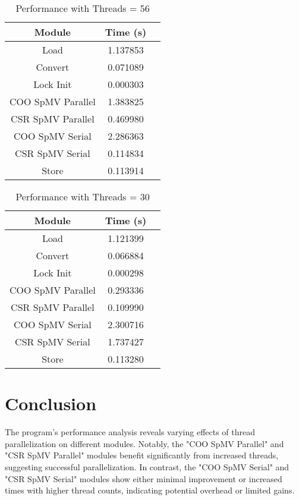 \documentclass[11pt, twocolumn]{article}
\begin{document}
\begin{table}[H]
    \centering
    \begin{tabular}{|c|c|c|}
    \hline
    Module & Time (s)  \\
    \hline
    Load & 1.137853  \\
    Convert & 0.071089  \\
    Lock Init & 0.000303  \\
    COO SpMV Parallel & 1.383825  \\
    CSR SpMV Parallel & 0.469980  \\
    COO SpMV Serial & 2.286363  \\
    CSR SpMV Serial & 0.114834  \\
    Store & 0.113914 \\
    
    \hline
    \end{tabular}
    \caption{Performance with Threads = 56}
\end{table}

\begin{table}[H]
    \centering
    \begin{tabular}{|c|c|c|}
    \hline
    Module & Time (s)  \\
    \hline
    Load & 1.121399  \\
    Convert & 0.066884 \\
    Lock Init & 0.000298  \\
    COO SpMV Parallel & 0.293336  \\
    CSR SpMV Parallel & 0.109990  \\
    COO SpMV Serial & 2.300716  \\
    CSR SpMV Serial & 1.737427  \\
    Store & 0.113280 \\
    
    \hline
    \end{tabular}
    \caption{Performance with Threads = 30}
\end{table}

\section{Conclusion}
The program's performance analysis reveals varying effects of thread parallelization on different modules. Notably, the "COO SpMV Parallel" and "CSR SpMV Parallel" modules benefit significantly from increased threads, suggesting successful parallelization. In contrast, the "COO SpMV Serial" and "CSR SpMV Serial" modules show either minimal improvement or increased times with higher thread counts, indicating potential overhead or limited gains. 
\end{document}
